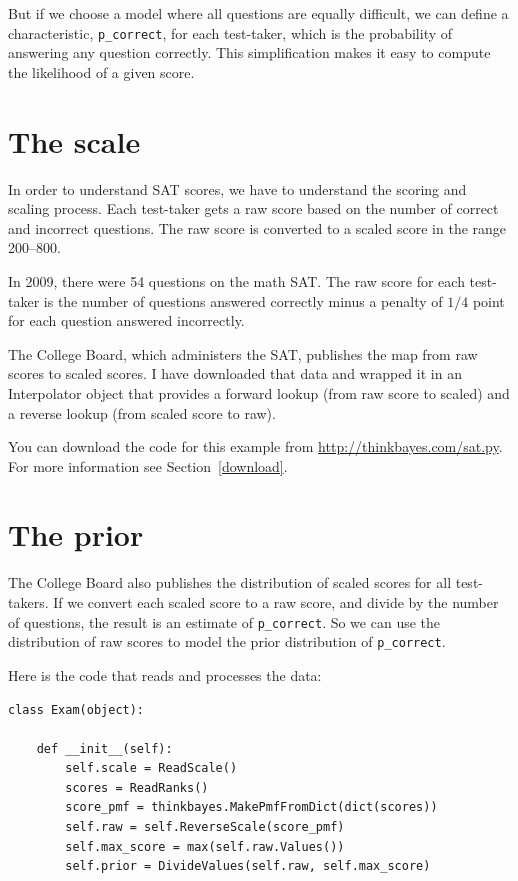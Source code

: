 \documentclass[12pt]{book}
\begin{document}
But if we choose a model where all questions are equally difficult, we
can define a characteristic, \verb"p_correct", for each test-taker,
which is the probability of answering any question correctly.  This
simplification makes it easy to compute the likelihood of a given
score.


\section{The scale}

In order to understand SAT scores, we have to understand the scoring
and scaling process.  Each test-taker gets a raw score based on the
number of correct and incorrect questions.  The raw score is converted
to a scaled score in the range 200--800.

In 2009, there were 54 questions on the math SAT.  The raw score
for each test-taker is the number of questions answered correctly
minus a penalty of $1/4$ point for each question answered incorrectly.

The College Board, which administers the SAT, publishes the
map from raw scores to scaled scores.  I have downloaded that
data and wrapped it in an Interpolator object that provides a forward
lookup (from raw score to scaled) and a reverse lookup (from scaled
score to raw).

You can download the code for this example from
\url{http://thinkbayes.com/sat.py}.
  For more information
see Section~\ref{download}.

\section{The prior}

The College Board also publishes the distribution of scaled scores
for all test-takers.  If we convert each scaled score to a raw score,
and divide by the number of questions, the result is an estimate
of \verb"p_correct".
So we can use the distribution of raw scores to model the
prior distribution of \verb"p_correct".

Here is the code that reads and processes the data:

\begin{verbatim}
class Exam(object):

    def __init__(self):
        self.scale = ReadScale()
        scores = ReadRanks()
        score_pmf = thinkbayes.MakePmfFromDict(dict(scores))
        self.raw = self.ReverseScale(score_pmf)
        self.max_score = max(self.raw.Values())
        self.prior = DivideValues(self.raw, self.max_score)
\end{verbatim}
\end{document}
